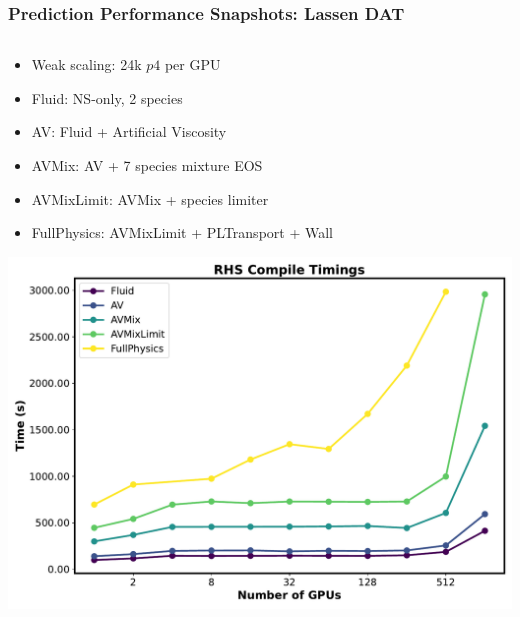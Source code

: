 \begin{frame}\frametitle{Prediction Performance Snapshots: Lassen DAT}
    \begin{columns}[T]  %
    \begin{column}{0.5\textwidth}
      \begin{itemize}
        \item Weak scaling: 24k $p4$ per GPU
        \item Fluid: NS-only, 2 species
        \item AV: Fluid + Artificial Viscosity
        \item AVMix: AV + 7 species mixture EOS
        \item AVMixLimit: AVMix + species limiter
        \item FullPhysics: AVMixLimit + PLTransport + Wall
      \end{itemize}
      \includegraphics[width=.7\textwidth]{Figures/RHSCompileTimes.pdf}
    \end{column}
    

\end{columns}
\end{frame}
